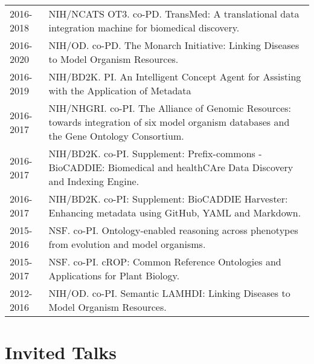 \documentclass[11pt,fullpage]{article}
\begin{document}
\begin{longtable}{p{0.5in}|p{5.5in}}

2016-2018 & NIH/NCATS OT3. co-PD. TransMed: A translational data integration machine for biomedical discovery.\\

2016-2020 & NIH/OD. co-PD. The Monarch Initiative: Linking Diseases to Model Organism Resources. \\

2016-2019 & NIH/BD2K. PI. An Intelligent Concept Agent for Assisting with the Application of Metadata \\

2016-2017 & NIH/NHGRI. co-PI. The Alliance of Genomic Resources: towards integration of six model organism databases and the Gene Ontology Consortium.  \\

2016-2017 & NIH/BD2K. co-PI. Supplement: Prefix-commons - BioCADDIE: Biomedical and healthCAre Data Discovery and Indexing Engine.\\

2016-2017 & NIH/BD2K. co-PI: Supplement: BioCADDIE Harvester: Enhancing metadata using GitHub, YAML and Markdown. \\

2015-2016 & NSF. co-PI. Ontology-enabled reasoning across phenotypes from evolution and model organisms. \\

2015-2017 & NSF. co-PI. cROP: Common Reference Ontologies and Applications for Plant Biology. \\

2012-2016 & NIH/OD. co-PI. Semantic LAMHDI: Linking Diseases to Model Organism Resources. \\


\end{longtable}



\section*{Invited Talks}
\end{document}
